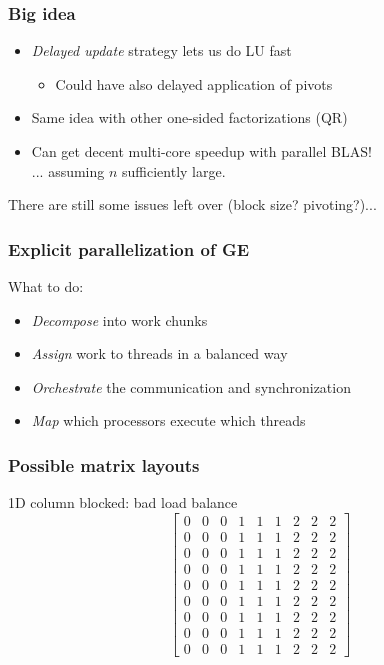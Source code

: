 \documentclass{beamer}
\begin{document}
\begin{frame}
  \frametitle{Big idea}
  
  \begin{itemize}
  \item {\em Delayed update} strategy lets us do LU fast
    \begin{itemize}
    \item Could have also delayed application of pivots
    \end{itemize}
  \item Same idea with other one-sided factorizations (QR)
  \item Can get decent multi-core speedup with parallel BLAS! \\
    ... assuming $n$ sufficiently large.
  \end{itemize}
  There are still some issues left over (block size? pivoting?)...
\end{frame}

\begin{frame}
  \frametitle{Explicit parallelization of GE}

  What to do:
  \begin{itemize}
  \item {\em Decompose} into work chunks
  \item {\em Assign} work to threads in a balanced way
  \item {\em Orchestrate} the communication and synchronization
  \item {\em Map} which processors execute which threads
  \end{itemize}
\end{frame}


\begin{frame}
  \frametitle{Possible matrix layouts}

  1D column blocked: bad load balance
  \[
  \begin{bmatrix}
    0 & 0 & 0 & 1 & 1 & 1 & 2 & 2 & 2 \\
    0 & 0 & 0 & 1 & 1 & 1 & 2 & 2 & 2 \\
    0 & 0 & 0 & 1 & 1 & 1 & 2 & 2 & 2 \\
    0 & 0 & 0 & 1 & 1 & 1 & 2 & 2 & 2 \\
    0 & 0 & 0 & 1 & 1 & 1 & 2 & 2 & 2 \\
    0 & 0 & 0 & 1 & 1 & 1 & 2 & 2 & 2 \\
    0 & 0 & 0 & 1 & 1 & 1 & 2 & 2 & 2 \\
    0 & 0 & 0 & 1 & 1 & 1 & 2 & 2 & 2 \\
    0 & 0 & 0 & 1 & 1 & 1 & 2 & 2 & 2 
  \end{bmatrix}
  \]
\end{frame}
\end{document}
